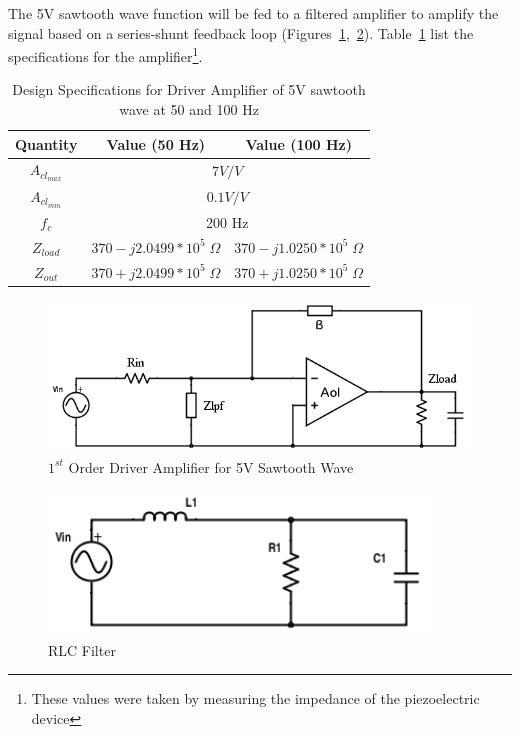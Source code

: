 \documentclass[12pt]{report}
\begin{document}
The 5V sawtooth wave function will be fed to a filtered amplifier to amplify the signal based on a series-shunt feedback loop (Figures~\ref{fig:sawamp},~\ref{fig:rlcfilter}). Table~\ref{driverspecs} list the specifications for the amplifier\footnote{These values were taken by measuring the impedance of the piezoelectric device}.\newline

\begin{table}[!htpb]
\begin{center}
\begin{tabular}{*3c}
\toprule 
  Quantity & Value (50 Hz) & Value (100 Hz)\\ 
  \midrule                   
  $A_{cl_{max}}$ & \multicolumn{2}{c}{$7 V/V$} \\
  $A_{cl_{min}}$ & \multicolumn{2}{c}{$0.1 V/V$} \\
  $f_{c}$ & \multicolumn{2}{c}{200 Hz} \\
  $Z_{load}$ & $370 - j2.0499*10^5 \;\Omega$ & $370- j1.0250*10^5 \;\Omega$\\
  $Z_{out}$ & $370 + j2.0499*10^5 \;\Omega$ & $370 + j1.0250*10^5 \;\Omega$\\
  \bottomrule 
\end{tabular}
\caption{Design Specifications for Driver Amplifier of 5V sawtooth wave at 50 and 100 Hz}
\label{driverspecs}
\end{center}
\end{table}
 
 \begin{figure}[h!]
 \centering
 \includegraphics[width=6in]{driver_amp.png}
 \caption[Driver Amplifier]{$1^{st}$ Order Driver Amplifier for 5V Sawtooth Wave}
 \label{fig:sawamp}
 \end{figure}

\begin{figure}[h!]
\centering
\includegraphics[width=4in]{rlc_filter.png}
\caption[RLC Filter]{RLC Filter}
\label{fig:rlcfilter}
\end{figure}
\end{document}
